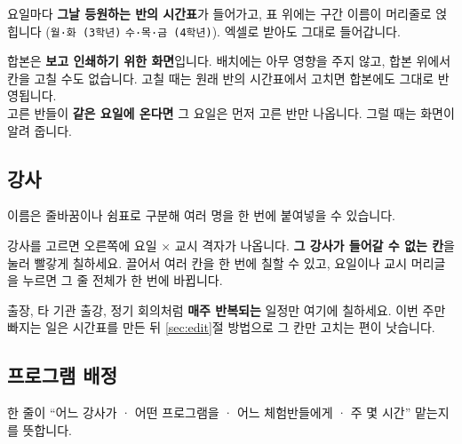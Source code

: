 \documentclass[11pt,a4paper]{article}
\newcommand{\code}[1]{\texttt{\small #1}}
\begin{document}
요일마다 \textbf{그날 등원하는 반의 시간표}가 들어가고, 표 위에는 구간 이름이 머리줄로 얹힙니다
(\code{월·화 (3학년)} \textbar{} \code{수·목·금 (4학년)}). 엑셀로 받아도 그대로 들어갑니다.

\begin{warn}
합본은 \textbf{보고 인쇄하기 위한 화면}입니다. 배치에는 아무 영향을 주지 않고, 합본 위에서 칸을 고칠 수도 없습니다.
고칠 때는 원래 반의 시간표에서 고치면 합본에도 그대로 반영됩니다.\\[2pt]
고른 반들이 \textbf{같은 요일에 온다면} 그 요일은 먼저 고른 반만 나옵니다. 그럴 때는 화면이 알려 줍니다.
\end{warn}

\subsection{강사}

이름은 줄바꿈이나 쉼표로 구분해 여러 명을 한 번에 붙여넣을 수 있습니다.

강사를 고르면 오른쪽에 요일 × 교시 격자가 나옵니다. \textbf{그 강사가 들어갈 수 없는 칸}을 눌러 빨갛게 칠하세요.
끌어서 여러 칸을 한 번에 칠할 수 있고, 요일이나 교시 머리글을 누르면 그 줄 전체가 한 번에 바뀝니다.

\begin{tip}
출장, 타 기관 출강, 정기 회의처럼 \textbf{매주 반복되는} 일정만 여기에 칠하세요.
이번 주만 빠지는 일은 시간표를 만든 뒤 \ref{sec:edit}절 방법으로 그 칸만 고치는 편이 낫습니다.
\end{tip}

\subsection{프로그램 배정}

한 줄이 ``어느 강사가 · 어떤 프로그램을 · 어느 체험반들에게 · 주 몇 시간'' 맡는지를 뜻합니다.
\end{document}
